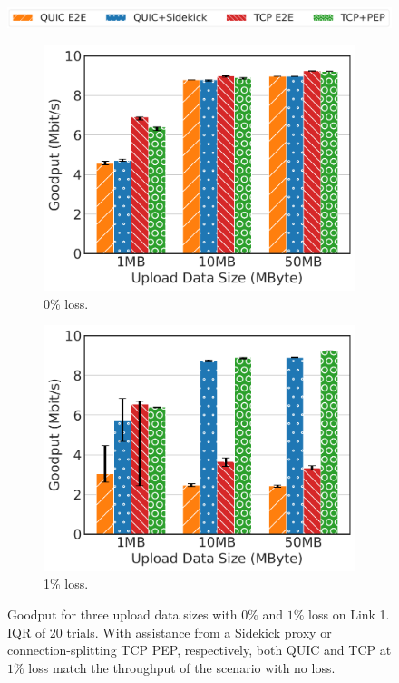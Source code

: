 \begin{figure}[t]
\centering
\includegraphics[width=\columnwidth]{sidekick/figures/fig5_baseline_bar_legend.pdf}
\begin{subfigure}{0.49\linewidth}
	\includegraphics[width=\linewidth]{sidekick/figures/fig5_baseline_loss0p.pdf}
	\caption{0\% loss.}
	\label{fig:sidekick:fairness-bar:loss0p}
\end{subfigure}
\begin{subfigure}{0.49\linewidth}
	\includegraphics[width=\linewidth]{sidekick/figures/fig5_baseline_loss1p.pdf}
	\caption{1\% loss.}
	\label{fig:sidekick:fairness-bar:loss1p}
\end{subfigure}
\caption{Goodput for three upload data sizes with $0\%$ and $1\%$ loss on Link
 1. IQR of 20 trials. With assistance from a Sidekick proxy or connection-splitting
 TCP PEP, respectively, both QUIC and TCP at $1\%$ loss match the
 throughput of the scenario with no loss. }
\label{fig:sidekick:fairness-bar}
\end{figure}
